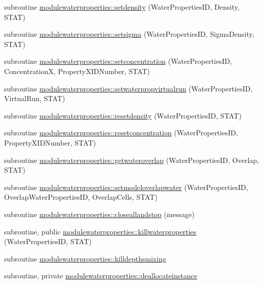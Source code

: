 \begin{DoxyCompactItemize}
\item 
subroutine \mbox{\hyperlink{namespacemodulewaterproperties_a0e9ad0864f289819d005ffe929ac3f86}{modulewaterproperties\+::setdensity}} (Water\+Properties\+ID, Density, S\+T\+AT)
\item 
subroutine \mbox{\hyperlink{namespacemodulewaterproperties_a84c625b22d0fa0200b0f18fc38efb8e7}{modulewaterproperties\+::setsigma}} (Water\+Properties\+ID, Sigma\+Density, S\+T\+AT)
\item 
subroutine \mbox{\hyperlink{namespacemodulewaterproperties_aea5dfa662931ed10a0e9543a5150c9b5}{modulewaterproperties\+::setconcentration}} (Water\+Properties\+ID, ConcentrationX, Property\+X\+I\+D\+Number, S\+T\+AT)
\item 
subroutine \mbox{\hyperlink{namespacemodulewaterproperties_abc01d8d69bf69056b5ad8b7fc0ebb668}{modulewaterproperties\+::setwaterpropvirtualrun}} (Water\+Properties\+ID, Virtual\+Run, S\+T\+AT)
\item 
subroutine \mbox{\hyperlink{namespacemodulewaterproperties_ac8f850628190d4096c329efc4d1880cc}{modulewaterproperties\+::resetdensity}} (Water\+Properties\+ID, S\+T\+AT)
\item 
subroutine \mbox{\hyperlink{namespacemodulewaterproperties_a09f49ce7e65baca37ff989dd6573e711}{modulewaterproperties\+::resetconcentration}} (Water\+Properties\+ID, Property\+X\+I\+D\+Number, S\+T\+AT)
\item 
subroutine \mbox{\hyperlink{namespacemodulewaterproperties_a923a45b4d978be815b69f1ca9bb63891}{modulewaterproperties\+::getwateroverlap}} (Water\+Properties\+ID, Overlap, S\+T\+AT)
\item 
subroutine \mbox{\hyperlink{namespacemodulewaterproperties_a485e6f75e05fccffb1b2eba1fc8c0226}{modulewaterproperties\+::setmodeloverlapwater}} (Water\+Properties\+ID, Overlap\+Water\+Properties\+ID, Overlap\+Cells, S\+T\+AT)
\item 
subroutine \mbox{\hyperlink{namespacemodulewaterproperties_a5bb74dfe4637836633ca6817a4a72758}{modulewaterproperties\+::closeallandstop}} (message)
\item 
subroutine, public \mbox{\hyperlink{namespacemodulewaterproperties_a1b9de12d1335129516b68f6f80f85e49}{modulewaterproperties\+::killwaterproperties}} (Water\+Properties\+ID, S\+T\+AT)
\item 
subroutine \mbox{\hyperlink{namespacemodulewaterproperties_a75dba19ef36b16b901b8d7bab39b00bc}{modulewaterproperties\+::killdepthsmixing}}
\item 
subroutine, private \mbox{\hyperlink{namespacemodulewaterproperties_afcf00b3b04c6e13ebfe955c7074bc924}{modulewaterproperties\+::deallocateinstance}}

\end{DoxyCompactItemize}
